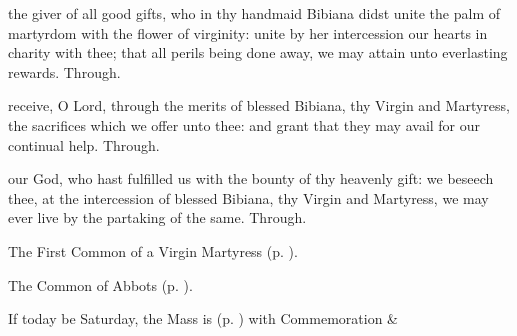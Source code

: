 \collect

\vspace{-0.2\baselineskip}

 the giver of all good gifts, who in thy handmaid Bibiana didst unite the palm of martyrdom with the flower of virginity: unite by her intercession our hearts in charity with thee; that all perils being done away, we may attain unto everlasting rewards. Through.

\vspace{-0.3\baselineskip}

\secret

\vspace{-0.15\baselineskip}

 receive, O Lord, through the merits of blessed Bibiana, thy Virgin and Martyress, the sacrifices which we offer unto thee: and grant that they may avail for our continual help. Through.

\vspace{-0.3\baselineskip}

\postcommunion

\vspace{-0.15\baselineskip}

 our God, who hast fulfilled us with the bounty of thy heavenly gift: we beseech thee, at the intercession of blessed Bibiana, thy Virgin and Martyress, we may ever live by the partaking of the same. Through.


\clearpage
{}

\begin{rubric}
	The First Common of a Virgin Martyress (p. \pageref{CommonVirginMartyrI}).
\end{rubric}



\begin{rubric}
	The Common of Abbots (p. \pageref{CommonAbbots}).
\end{rubric}

\begin{rubric}
	If today be Saturday, the Mass is  (p. \pageref{MarySaturday}) with Commemoration  \& 
\end{rubric}


